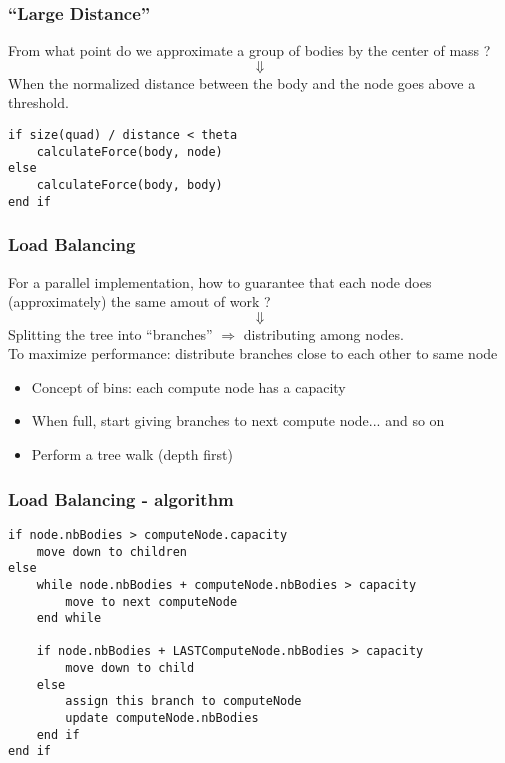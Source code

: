 \begin{frame}[fragile]
  \frametitle{``Large Distance''}
  From what point do we approximate a group of bodies by the center of mass ?
  \[\Downarrow\]
  When the normalized distance between the body and the node goes above a threshold.\\
\begin{Verbatim}[frame=single]
if size(quad) / distance < theta
    calculateForce(body, node)
else
    calculateForce(body, body)
end if
\end{Verbatim}
\end{frame}

\begin{frame}
  \frametitle{Load Balancing}
  For a parallel implementation, how to guarantee that each node does (approximately) the same amout of work ?
  \[\Downarrow\]
  Splitting the tree into ``branches'' $\Rightarrow$ distributing among nodes.\\
  \vspace{0.5cm}
  To maximize performance: distribute branches close to each other to same node
  \begin{itemize}
    \item Concept of bins: each compute node has a capacity
    \item When full, start giving branches to next compute node... and so on
    \item Perform a tree walk (depth first)
  \end{itemize}
\end{frame}

\begin{frame}[fragile]
  \frametitle{Load Balancing - algorithm}
  \begin{Verbatim}[frame=single, fontsize = \footnotesize]
if node.nbBodies > computeNode.capacity
    move down to children    
else 
    while node.nbBodies + computeNode.nbBodies > capacity
        move to next computeNode
    end while
    
    if node.nbBodies + LASTComputeNode.nbBodies > capacity
        move down to child
    else
        assign this branch to computeNode
        update computeNode.nbBodies
    end if
end if
  \end{Verbatim}
\end{frame}
